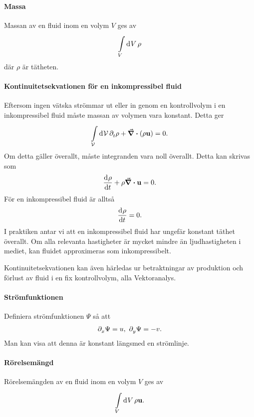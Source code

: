 \paragraph{Massa}
Massan av en fluid inom en volym $V$ ges av
\begin{align*}
	\int\limits_{V}^{}\dd[]{V}\rho
\end{align*}
där $\rho$ är tätheten.

\paragraph{Kontinuitetsekvationen för en inkompressibel fluid}
Eftersom ingen vätska strömmar ut eller in genom en kontrollvolym i en inkompressibel fluid måste massan av volymen vara konstant. Detta ger
\begin{align*}
	\int\limits_{\mathcal{V}}^{}\dd[]{\mathcal{V}}\partial_{t}^{}\rho + \div(\rho\vb{u}) = 0.
\end{align*}
Om detta gäller överallt, måste integranden vara noll överallt. Detta kan skrivas som
\begin{align*}
	\dv[]{\rho}{t} + \rho\div{\vb{u}} = 0.
\end{align*}
För en inkompressibel fluid är alltså
\begin{align*}
	\dv[]{\rho}{t} = 0.
\end{align*}
I praktiken antar vi att en inkompressibel fluid har ungefär konstant täthet överallt. Om alla relevanta hastigheter är mycket mindre än ljudhastigheten i mediet, kan fluidet approximeras som inkompressibelt.

Kontinuitetsekvationen kan även härledas ur betraktningar av produktion och förlust av fluid i en fix kontrollvolym, alla Vektoranalys.

\paragraph{Strömfunktionen}
Definiera strömfunktionen $\Psi$ så att
\begin{align*}
	\partial_{x}^{}\Psi = u,\ \partial_{y}^{}\Psi = -v.
\end{align*}
Man kan visa att denna är konstant längsmed en strömlinje.

\paragraph{Rörelsemängd}
Rörelsemängden av en fluid inom en volym $V$ ges av
\begin{align*}
	\int\limits_{V}^{}\dd[]{V}\rho\vb{u}.
\end{align*}